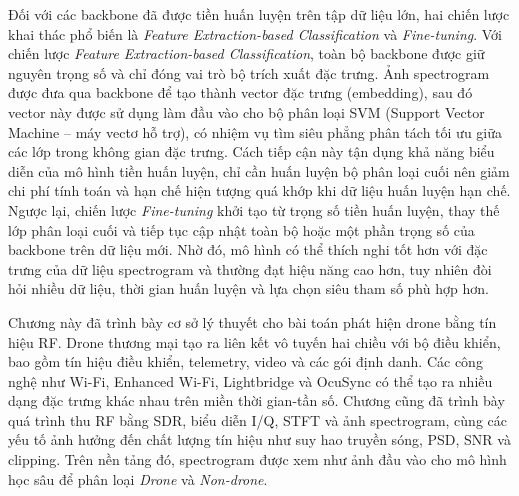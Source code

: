 \documentclass[../DoAn.tex]{subfiles}
\begin{document}
Đối với các backbone đã được tiền huấn luyện trên tập dữ liệu lớn, hai chiến lược khai thác phổ biến là \textit{Feature Extraction-based Classification} và \textit{Fine-tuning}. Với chiến lược \textit{Feature Extraction-based Classification}, toàn bộ backbone được giữ nguyên trọng số và chỉ đóng vai trò bộ trích xuất đặc trưng. Ảnh spectrogram được đưa qua backbone để tạo thành vector đặc trưng (embedding), sau đó vector này được sử dụng làm đầu vào cho bộ phân loại SVM (Support Vector Machine -- máy vectơ hỗ trợ), có nhiệm vụ tìm siêu phẳng phân tách tối ưu giữa các lớp trong không gian đặc trưng. Cách tiếp cận này tận dụng khả năng biểu diễn của mô hình tiền huấn luyện, chỉ cần huấn luyện bộ phân loại cuối nên giảm chi phí tính toán và hạn chế hiện tượng quá khớp khi dữ liệu huấn luyện hạn chế. Ngược lại, chiến lược \textit{Fine-tuning} khởi tạo từ trọng số tiền huấn luyện, thay thế lớp phân loại cuối và tiếp tục cập nhật toàn bộ hoặc một phần trọng số của backbone trên dữ liệu mới. Nhờ đó, mô hình có thể thích nghi tốt hơn với đặc trưng của dữ liệu spectrogram và thường đạt hiệu năng cao hơn, tuy nhiên đòi hỏi nhiều dữ liệu, thời gian huấn luyện và lựa chọn siêu tham số phù hợp hơn.



Chương này đã trình bày cơ sở lý thuyết cho bài toán phát hiện drone bằng tín hiệu RF. Drone thương mại tạo ra liên kết vô tuyến hai chiều với bộ điều khiển, bao gồm tín hiệu điều khiển, telemetry, video và các gói định danh. Các công nghệ như Wi-Fi, Enhanced Wi-Fi, Lightbridge và OcuSync có thể tạo ra nhiều dạng đặc trưng khác nhau trên miền thời gian-tần số. Chương cũng đã trình bày quá trình thu RF bằng SDR, biểu diễn I/Q, STFT và ảnh spectrogram, cùng các yếu tố ảnh hưởng đến chất lượng tín hiệu như suy hao truyền sóng, PSD, SNR và clipping. Trên nền tảng đó, spectrogram được xem như ảnh đầu vào cho mô hình học sâu để phân loại \textit{Drone} và \textit{Non-drone}.
\end{document}
